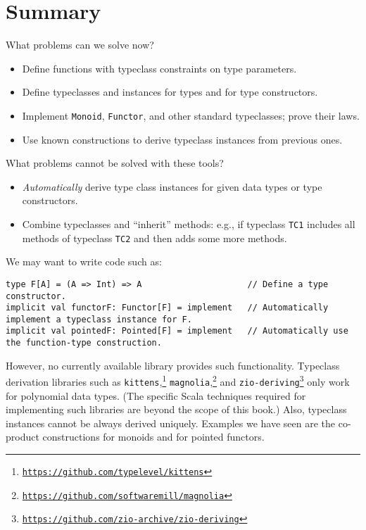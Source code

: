 \section{Summary}

What problems can we solve now?
\begin{itemize}
\item Define functions with typeclass constraints on type parameters.
\item Define typeclasses and instances for types and for type constructors.
\item Implement \lstinline!Monoid!, \lstinline!Functor!, and other standard
typeclasses; prove their laws.
\item Use known constructions to derive typeclass instances from previous
ones.
\end{itemize}
What problems cannot be solved with these tools?
\begin{itemize}
\item \emph{Automatically} derive type class instances for given data types
or type constructors.
\item Combine typeclasses and \textsf{``}inherit\textsf{''} methods: e.g., if typeclass
\lstinline!TC1! includes all methods of typeclass \lstinline!TC2!
and then adds some more methods.
\end{itemize}
We may want to write code such as:
\begin{lstlisting}
type F[A] = (A => Int) => A                     // Define a type constructor.
implicit val functorF: Functor[F] = implement   // Automatically implement a typeclass instance for F.
implicit val pointedF: Pointed[F] = implement   // Automatically use the function-type construction.
\end{lstlisting}
However, no currently available library provides such functionality.
Typeclass derivation libraries such as \lstinline!kittens!,\footnote{\texttt{\href{https://github.com/typelevel/kittens}{https://github.com/typelevel/kittens}}}
\lstinline!magnolia!,\footnote{\texttt{\href{https://github.com/softwaremill/magnolia}{https://github.com/softwaremill/magnolia}}}
and \lstinline!zio-deriving!\footnote{\texttt{\href{https://github.com/zio-archive/zio-deriving}{https://github.com/zio-archive/zio-deriving}}}
only work for polynomial data types. (The specific Scala techniques
required for implementing such libraries are beyond the scope of this
book.) Also, typeclass instances cannot be always derived uniquely.
Examples we have seen are the co-product constructions for monoids
and for pointed functors.

